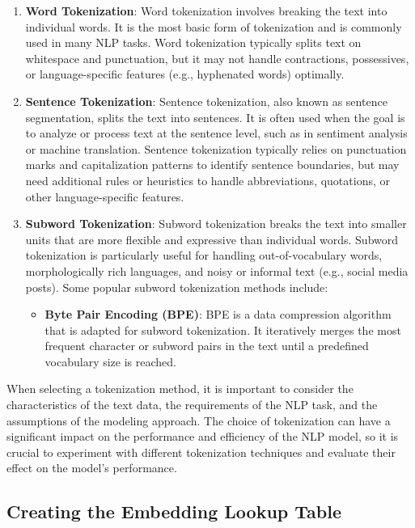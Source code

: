 \documentclass[12pt]{article}
\begin{document}
\begin{enumerate}
\item \textbf{Word Tokenization}: Word tokenization involves breaking the text into individual words. It is the most basic form of tokenization and is commonly used in many NLP tasks. Word tokenization typically splits text on whitespace and punctuation, but it may not handle contractions, possessives, or language-specific features (e.g., hyphenated words) optimally.

\item \textbf{Sentence Tokenization}: Sentence tokenization, also known as sentence segmentation, splits the text into sentences. It is often used when the goal is to analyze or process text at the sentence level, such as in sentiment analysis or machine translation. Sentence tokenization typically relies on punctuation marks and capitalization patterns to identify sentence boundaries, but may need additional rules or heuristics to handle abbreviations, quotations, or other language-specific features.

\item \textbf{Subword Tokenization}: Subword tokenization breaks the text into smaller units that are more flexible and expressive than individual words. Subword tokenization is particularly useful for handling out-of-vocabulary words, morphologically rich languages, and noisy or informal text (e.g., social media posts). Some popular subword tokenization methods include:
\begin{itemize}
\item \textbf{Byte Pair Encoding (BPE)}: BPE is a data compression algorithm that is adapted for subword tokenization. It iteratively merges the most frequent character or subword pairs in the text until a predefined vocabulary size is reached.

\end{itemize}
\end{enumerate}
When selecting a tokenization method, it is important to consider the characteristics of the text data, the requirements of the NLP task, and the assumptions of the modeling approach. The choice of tokenization can have a significant impact on the performance and efficiency of the NLP model, so it is crucial to experiment with different tokenization techniques and evaluate their effect on the model's performance.


\subsection{Creating the Embedding Lookup Table}
\end{document}
